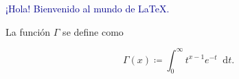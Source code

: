 \documentclass{article}
\newcommand*\diff{\mathop{}\!\mathrm{d}}
\begin{document}
\textcolor{DarkBlue}{¡Hola! Bienvenido al mundo de \LaTeX.}
\begin{center}
	La función $\Gamma$ se define como
\end{center}
\[\boxed{
\Gamma\left(x\right)\coloneqq
\int_{0}^{\infty}
t^{x-1}e^{-t}\diff t.
}
\]
\end{document}
